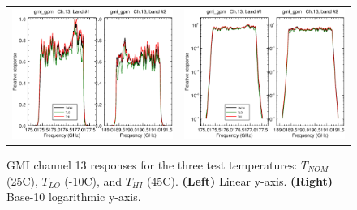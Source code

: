 \begin{figure}[htp]
  \centering
  \begin{tabular}{c c}
    \includegraphics[scale=0.3]{graphics/lin/gmi_gpm-13.eps} &
    \includegraphics[scale=0.3]{graphics/log/gmi_gpm-13.eps}
  \end{tabular}
  \caption{GMI channel 13 responses for the three test temperatures: $T_{NOM}$ (25\textdegree{}C), $T_{LO}$ (-10\textdegree{}C), and $T_{HI}$ (45\textdegree{}C). \textbf{(Left)} Linear y-axis. \textbf{(Right)} Base-10 logarithmic y-axis.}
  \label{fig:ch13_response}
\end{figure}


